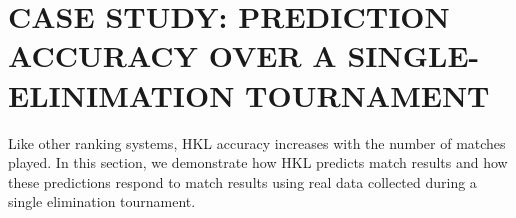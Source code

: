 \documentclass[letterpaper, 10 pt, conference]{ieeeconf}  %
\begin{document}
\section{CASE STUDY: PREDICTION ACCURACY OVER A SINGLE-ELINIMATION TOURNAMENT}
Like other ranking systems, HKL accuracy increases with the number of matches
played. In this section, we demonstrate how HKL predicts match results and how
these predictions respond to match results using real data collected during a
single elimination tournament.

\end{document}
